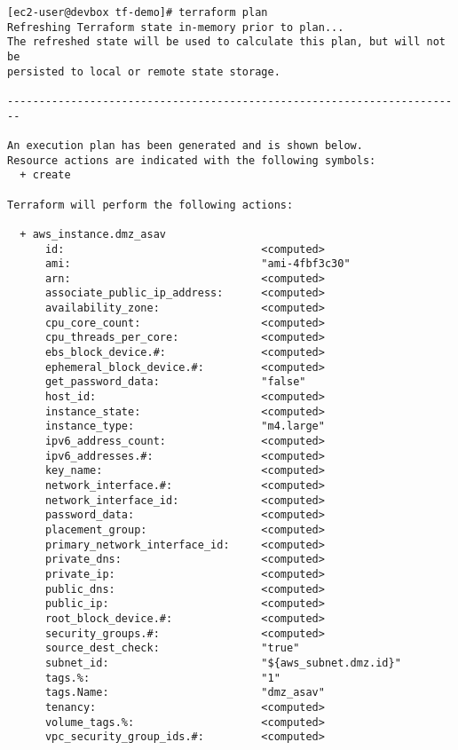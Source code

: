 \begin{verbatim}
[ec2-user@devbox tf-demo]# terraform plan
Refreshing Terraform state in-memory prior to plan...
The refreshed state will be used to calculate this plan, but will not be
persisted to local or remote state storage.

------------------------------------------------------------------------

An execution plan has been generated and is shown below.
Resource actions are indicated with the following symbols:
  + create

Terraform will perform the following actions:

  + aws_instance.dmz_asav
      id:                               <computed>
      ami:                              "ami-4fbf3c30"
      arn:                              <computed>
      associate_public_ip_address:      <computed>
      availability_zone:                <computed>
      cpu_core_count:                   <computed>
      cpu_threads_per_core:             <computed>
      ebs_block_device.#:               <computed>
      ephemeral_block_device.#:         <computed>
      get_password_data:                "false"
      host_id:                          <computed>
      instance_state:                   <computed>
      instance_type:                    "m4.large"
      ipv6_address_count:               <computed>
      ipv6_addresses.#:                 <computed>
      key_name:                         <computed>
      network_interface.#:              <computed>
      network_interface_id:             <computed>
      password_data:                    <computed>
      placement_group:                  <computed>
      primary_network_interface_id:     <computed>
      private_dns:                      <computed>
      private_ip:                       <computed>
      public_dns:                       <computed>
      public_ip:                        <computed>
      root_block_device.#:              <computed>
      security_groups.#:                <computed>
      source_dest_check:                "true"
      subnet_id:                        "${aws_subnet.dmz.id}"
      tags.%:                           "1"
      tags.Name:                        "dmz_asav"
      tenancy:                          <computed>
      volume_tags.%:                    <computed>
      vpc_security_group_ids.#:         <computed>


\end{verbatim}
